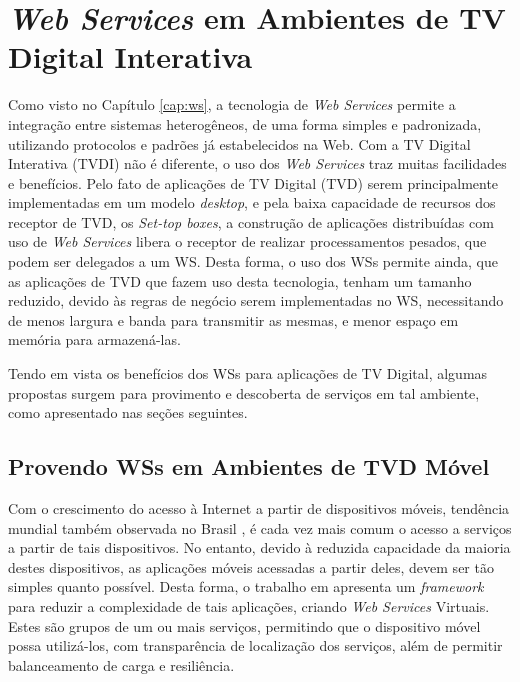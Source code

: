 \section{\textit{Web Services} em Ambientes de TV Digital Interativa}

Como visto no Capítulo \ref{cap:ws}, a tecnologia de \textit{Web Services} permite a integração entre sistemas heterogêneos, de uma forma simples e padronizada, utilizando protocolos e padrões já estabelecidos na Web. Com a TV Digital Interativa (TVDI) não é diferente, o uso dos \textit{Web Services} traz muitas facilidades e benefícios. Pelo fato de aplicações de TV Digital (TVD) serem principalmente implementadas em um modelo \textit{desktop}, e pela baixa capacidade de recursos dos receptor de TVD, os \textit{Set-top boxes}, a construção de aplicações distribuídas com uso de \textit{Web Services} libera o receptor de realizar processamentos pesados, que podem ser delegados a um WS. Desta forma, o uso dos WSs permite ainda, que as aplicações de TVD que fazem uso desta tecnologia, tenham um tamanho reduzido, devido às regras de negócio serem implementadas no WS, necessitando de menos largura e banda para transmitir as mesmas, e menor espaço em memória para armazená-las.

Tendo em vista os benefícios dos WSs para aplicações de TV Digital, algumas propostas surgem para provimento e descoberta de serviços em tal ambiente, como apresentado nas seções seguintes.

\subsection{Provendo WSs em Ambientes de TVD Móvel \cite{vilas2007providing}} %

Com o crescimento do acesso à Internet a partir de dispositivos móveis, tendência mundial também observada no Brasil 
\cite{banda-larga-movel-olhar-digital}, é cada vez mais comum o acesso a serviços a partir de tais dispositivos. No entanto, devido à reduzida capacidade da maioria destes dispositivos, as aplicações móveis acessadas a partir deles, devem ser tão simples quanto possível. Desta forma, o trabalho em \cite{vilas2007providing} apresenta um \textit{framework} para reduzir a complexidade de tais aplicações, criando \textit{Web Services} Virtuais. Estes são grupos de um ou mais serviços, permitindo que o dispositivo móvel possa utilizá-los, com transparência de localização dos serviços, além de permitir balanceamento de carga e resiliência.

